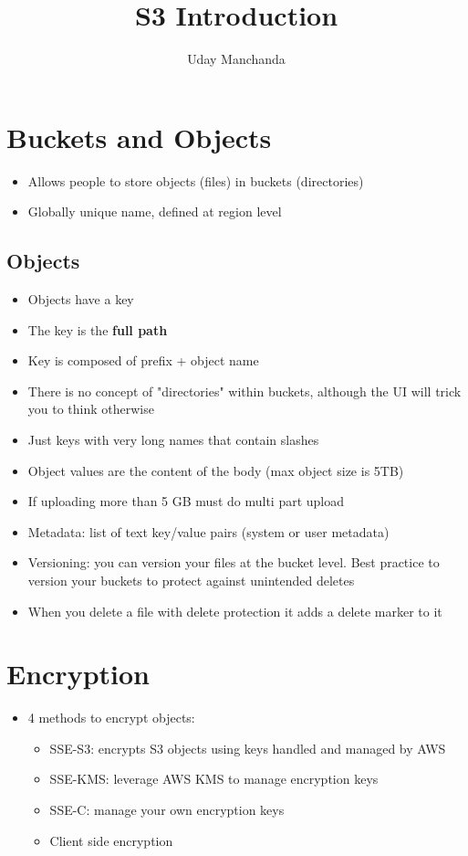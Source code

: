 \documentclass[]{scrartcl}
\title{S3 Introduction}
\author{Uday Manchanda}
\begin{document}
\maketitle

\section{Buckets and Objects}
\begin{itemize}
	\item Allows people to store objects (files) in buckets (directories)
	\item Globally unique name, defined at region level
\end{itemize}

\subsection{Objects}
\begin{itemize}
	\item Objects have a key
	\item The key is the \textbf{full path}
	\item Key is composed of prefix + object name
	\item There is no concept of "directories" within buckets, although the UI will trick you to think otherwise
	\item Just keys with very long names that contain slashes
	\item Object values are the content of the body (max object size is 5TB)
	\item If uploading more than 5 GB must do multi part upload
	\item Metadata: list of text key/value pairs (system or user metadata)
	\item Versioning: you can version your files at the bucket level. Best practice to version your buckets to protect against unintended deletes
	\item When you delete a file with delete protection it adds a delete marker to it
\end{itemize}

\section{Encryption}
\begin{itemize}
	\item 4 methods to encrypt objects:
	\begin{itemize}
		\item SSE-S3: encrypts S3 objects using keys handled and managed by AWS
		\item SSE-KMS: leverage AWS KMS to manage encryption keys
		\item SSE-C: manage your own encryption keys
		\item Client side encryption
	\end{itemize}
\end{itemize}
\end{document}
